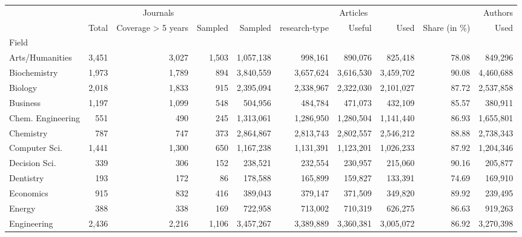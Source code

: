 \begin{tabular}{lrrrrrrrrr}
\toprule
{} & \multicolumn{3}{c}{Journals} & \multicolumn{5}{c}{Articles} &    Authors \\
{} &    Total & Coverage > 5 years & Sampled &    Sampled & research-type &    Useful &       Used & Share (in \%) &       Used \\
Field             &          &                    &         &            &               &           &            &              &            \\
\midrule
Arts/Humanities   &    3,451 &              3,027 &   1,503 &  1,057,138 &       998,161 &   890,076 &    825,418 &        78.08 &    849,296 \\
Biochemistry      &    1,973 &              1,789 &     894 &  3,840,559 &     3,657,624 & 3,616,530 &  3,459,702 &        90.08 &  4,460,688 \\
Biology           &    2,018 &              1,833 &     915 &  2,395,094 &     2,338,967 & 2,322,030 &  2,101,027 &        87.72 &  2,537,858 \\
Business          &    1,197 &              1,099 &     548 &    504,956 &       484,784 &   471,073 &    432,109 &        85.57 &    380,911 \\
Chem. Engineering &      551 &                490 &     245 &  1,313,061 &     1,286,950 & 1,280,504 &  1,141,440 &        86.93 &  1,655,801 \\
Chemistry         &      787 &                747 &     373 &  2,864,867 &     2,813,743 & 2,802,557 &  2,546,212 &        88.88 &  2,738,343 \\
Computer Sci.     &    1,441 &              1,300 &     650 &  1,167,238 &     1,131,391 & 1,123,201 &  1,026,233 &        87.92 &  1,204,346 \\
Decision Sci.     &      339 &                306 &     152 &    238,521 &       232,554 &   230,957 &    215,060 &        90.16 &    205,877 \\
Dentistry         &      193 &                172 &      86 &    178,588 &       165,899 &   159,827 &    133,391 &        74.69 &    169,910 \\
Economics         &      915 &                832 &     416 &    389,043 &       379,147 &   371,509 &    349,820 &        89.92 &    239,495 \\
Energy            &      388 &                338 &     169 &    722,958 &       713,002 &   710,319 &    626,275 &        86.63 &    919,263 \\
Engineering       &    2,436 &              2,216 &   1,106 &  3,457,267 &     3,389,889 & 3,360,381 &  3,005,072 &        86.92 &  3,270,398 \\

\end{tabular}
